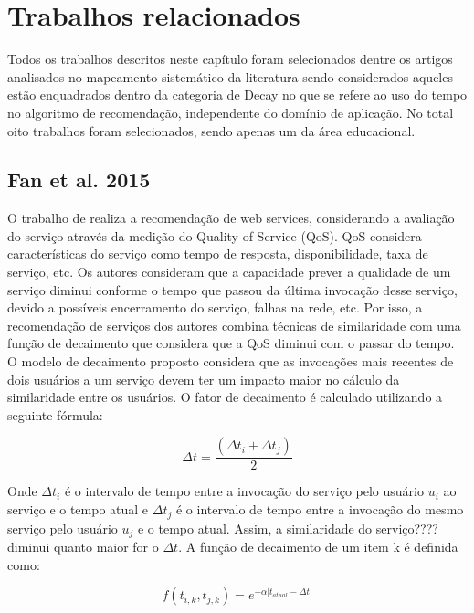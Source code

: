 \chapter{Trabalhos relacionados}

Todos os trabalhos descritos neste capítulo foram selecionados dentre os artigos analisados no mapeamento sistemático
da literatura \cite{de2017time} sendo considerados aqueles  estão enquadrados dentro da categoria de Decay no que
se refere ao uso do tempo no algoritmo de recomendação, independente do domínio de aplicação. No total oito trabalhos
foram selecionados, sendo apenas um da área educacional.

\section{Fan et al. 2015}

O trabalho de  realiza a recomendação de web services, considerando a avaliação do serviço
através da medição do Quality of Service (QoS). QoS considera características do serviço como tempo de resposta,
disponibilidade, taxa de serviço, etc. Os autores consideram que a capacidade prever a qualidade de um serviço diminui
conforme o tempo que passou da última invocação desse serviço, devido a possíveis encerramento do serviço, falhas na
rede, etc. Por isso, a recomendação de serviços dos autores combina técnicas de similaridade com uma função de
decaimento que considera que a QoS diminui com o passar do tempo. O modelo de decaimento proposto considera que as
invocações mais recentes de dois usuários a um serviço devem ter um impacto maior no cálculo da similaridade entre os
usuários. O fator de decaimento é calculado utilizando a seguinte fórmula:

\begin{equation}
  \Delta t = \frac{(\Delta t_i + \Delta t_j)}{2}
  \label{eq:fan-fator-decaimento}
\end{equation}


Onde $\Delta t_i$ é o intervalo de tempo entre a invocação do serviço pelo usuário $u_i$ ao serviço e o tempo atual e
$\Delta t_j$ é o intervalo de tempo entre a invocação do mesmo serviço pelo usuário $u_j$ e o tempo atual. Assim, a
similaridade do serviço????  diminui quanto maior for o $\Delta t$. A função de decaimento de um item k é definida como:

\begin{equation}
  f(t_{i,k}, t_{j,k}) = e^{-\alpha \left|t_{atual} - \Delta t \right|}
  \label{eq:fan-funcao-decaimento}
\end{equation}

